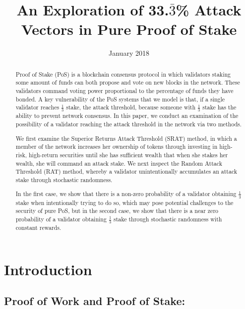 \documentclass{article}
\title{An Exploration of 33.$\bar{3}$\% Attack Vectors in Pure Proof of Stake}
\author{Aparna Krishnan, Zubin Koticha, Alexis Gauba, \and Maaz Uddin, Dev Ojha, Philip Hayes \\ \small{University of California, Berkeley} \\
\small{Blockchain Lab, Sutardja Center for Engineering and Technology} \\\small{Blockchain at Berkeley, Research and Development - Cryptoeconomics Research} \and \small{Special Thanks to Karl Floersch from the Ethereum Foundation, \and \small{\and \small Profs. Dawn Song, Gireeja Ranade, Satish Rao Department of EECS, UC Berkeley,
\and \small {Sankalp Aggarwal from Tendermint}}}}
\date{January 2018}
\renewcommand{\|}{\;|\;}
\begin{document}
\maketitle
\begin{abstract}
Proof of Stake (PoS) is a blockchain consensus protocol in which validators staking some amount of funds can both propose and vote on new blocks in the network. These validators command voting power proportional to the percentage of funds they have bonded. A key vulnerability of the PoS systems that we model is that, if a single validator reaches $\frac{1}{3}$ stake, the attack threshold, because someone with $\frac{1}{3}$ stake has the ability to prevent network consensus. In this paper, we conduct an examination of the possibility of a validator reaching the attack threshold in the network via two methods.  

We first examine the Superior Returns Attack Threshold (SRAT) method, in which a member of the network increases her ownership of tokens through investing in high-risk, high-return securities until she has sufficient wealth that when she stakes her wealth, she will command an attack stake. We next inspect the Random Attack Threshold (RAT) method, whereby a validator unintentionally accumulates an attack stake through stochastic randomness. 

In the first case, we show that there is a non-zero probability of a validator obtaining $\frac{1}{3}$ stake when intentionally trying to do so, which may pose potential challenges to the security of pure PoS, but in the second case, we show that there is a near zero probability of a validator obtaining $\frac{1}{3}$ stake through stochastic randomness with constant rewards. 

\end{abstract}

\section{Introduction}

\subsection*{Proof of Work and Proof of Stake:}
\end{document}
